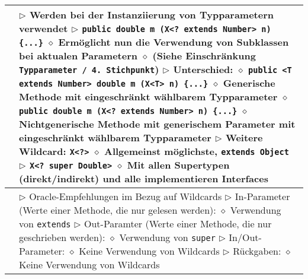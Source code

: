 \begin{longtable}{ | p{} p{} | }
	\makecell[l]{Wildcards} & \makecell[l]{
	$\triangleright$ Werden bei der Instanziierung von Typparametern verwendet \\
	$\triangleright$ \texttt{public double m (X<? extends Number> n) \{...\}} \\
	\hspace{0.4cm} $\diamond$ Ermöglicht nun die Verwendung von Subklassen bei aktualen Parametern \\
	\hspace{0.4cm} $\diamond$ (Siehe Einschränkung \texttt{Typparameter / 4. Stichpunkt}) \\
	$\triangleright$ \textbf{Unterschied:} \\
	\hspace{0.4cm} $\diamond$ \texttt{public <T extends Number> double m (X<T> n) \{...\}} \\
	\hspace{0.6cm} $\diamond$ Generische Methode mit eingeschränkt wählbarem Typparameter \\
	\hspace{0.4cm} $\diamond$ \texttt{public double m (X<? extends Number> n) \{...\}} \\
	\hspace{0.6cm} $\diamond$ Nichtgenerische Methode mit generischem Parameter mit eingeschränkt \\
	\hspace{1cm} wählbarem Typparameter \\
	$\triangleright$ Weitere Wildcard: \texttt{X<?>} \\
	\hspace{0.4cm} $\diamond$ Allgemeinst möglichste, \texttt{extends Object} \\
	$\triangleright$ \texttt{X<? super Double>} \\
	\hspace{0.4cm} $\diamond$ Mit allen Supertypen (direkt/indirekt) und alle implementieren Interfaces} \\ \hline

	\makecell[l]{Empfehlungen} & \makecell[l]{
	$\triangleright$ Oracle-Empfehlungen im Bezug auf Wildcards \\
	$\triangleright$ In-Parameter (Werte einer Methode, die nur gelesen werden): \\ 
	\hspace{0.4cm} $\diamond$ Verwendung von \texttt{extends} \\
	$\triangleright$ Out-Paramter (Werte einer Methode, die nur geschrieben werden): \\
	\hspace{0.4cm} $\diamond$ Verwendung von \texttt{super} \\
	$\triangleright$ In/Out-Parameter: \\
	\hspace{0.4cm} $\diamond$ Keine Verwendung von Wildcards \\
	$\triangleright$ Rückgaben: \\
	\hspace{0.4cm} $\diamond$ Keine Verwendung von Wildcards} \\ \hline


\end{longtable}
